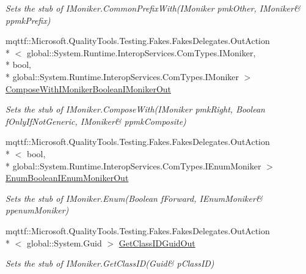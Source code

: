 \begin{DoxyCompactItemize}
\begin{DoxyCompactList}\small\item\em Sets the stub of I\-Moniker.\-Common\-Prefix\-With(I\-Moniker pmk\-Other, I\-Moniker\& ppmk\-Prefix)\end{DoxyCompactList}\item 
mqttf\-::\-Microsoft.\-Quality\-Tools.\-Testing.\-Fakes.\-Fakes\-Delegates.\-Out\-Action\\*
$<$ global\-::\-System.\-Runtime.\-Interop\-Services.\-Com\-Types.\-I\-Moniker, \\*
bool, \\*
global\-::\-System.\-Runtime.\-Interop\-Services.\-Com\-Types.\-I\-Moniker $>$ \hyperlink{class_system_1_1_runtime_1_1_interop_services_1_1_com_types_1_1_fakes_1_1_stub_i_moniker_a6f8749b4070371d126216c88ccc2ce74}{Compose\-With\-I\-Moniker\-Boolean\-I\-Moniker\-Out}
\begin{DoxyCompactList}\small\item\em Sets the stub of I\-Moniker.\-Compose\-With(I\-Moniker pmk\-Right, Boolean f\-Only\-If\-Not\-Generic, I\-Moniker\& ppmk\-Composite)\end{DoxyCompactList}\item 
mqttf\-::\-Microsoft.\-Quality\-Tools.\-Testing.\-Fakes.\-Fakes\-Delegates.\-Out\-Action\\*
$<$ bool, \\*
global\-::\-System.\-Runtime.\-Interop\-Services.\-Com\-Types.\-I\-Enum\-Moniker $>$ \hyperlink{class_system_1_1_runtime_1_1_interop_services_1_1_com_types_1_1_fakes_1_1_stub_i_moniker_a6a5162c4c68cc1e184cf943136dd4578}{Enum\-Boolean\-I\-Enum\-Moniker\-Out}
\begin{DoxyCompactList}\small\item\em Sets the stub of I\-Moniker.\-Enum(Boolean f\-Forward, I\-Enum\-Moniker\& ppenum\-Moniker)\end{DoxyCompactList}\item 
mqttf\-::\-Microsoft.\-Quality\-Tools.\-Testing.\-Fakes.\-Fakes\-Delegates.\-Out\-Action\\*
$<$ global\-::\-System.\-Guid $>$ \hyperlink{class_system_1_1_runtime_1_1_interop_services_1_1_com_types_1_1_fakes_1_1_stub_i_moniker_a03148046961c518b5f2bd8af0ca88053}{Get\-Class\-I\-D\-Guid\-Out}
\begin{DoxyCompactList}\small\item\em Sets the stub of I\-Moniker.\-Get\-Class\-I\-D(Guid\& p\-Class\-I\-D)\end{DoxyCompactList}\item 

\end{DoxyCompactItemize}
